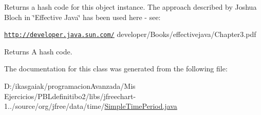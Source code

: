 Returns a hash code for this object instance. The approach described by Joshua Bloch in \char`\"{}\+Effective Java\char`\"{} has been used here -\/ see\+: 

{\ttfamily \href{http://developer.java.sun.com/}{\tt http\+://developer.\+java.\+sun.\+com/} developer/\+Books/effectivejava/\+Chapter3.\+pdf}

\begin{DoxyReturn}{Returns}
A hash code. 
\end{DoxyReturn}


The documentation for this class was generated from the following file\+:\begin{DoxyCompactItemize}
\item 
D\+:/ikasgaiak/programacion\+Avanzada/\+Mis Ejercicios/\+P\+B\+Ldefinitibo2/libs/jfreechart-\/1../source/org/jfree/data/time/\mbox{\hyperlink{_simple_time_period_8java}{Simple\+Time\+Period.\+java}}\end{DoxyCompactItemize}
